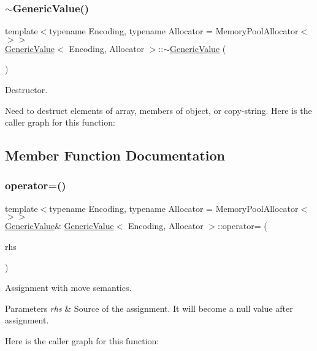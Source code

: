 \subsubsection{\texorpdfstring{$\sim$\+Generic\+Value()}{~GenericValue()}}
{\footnotesize\ttfamily template$<$typename Encoding, typename Allocator = Memory\+Pool\+Allocator$<$$>$$>$ \\
\hyperlink{class_generic_value}{Generic\+Value}$<$ Encoding, Allocator $>$\+::$\sim$\hyperlink{class_generic_value}{Generic\+Value} (\begin{DoxyParamCaption}{ }\end{DoxyParamCaption})\hspace{0.3cm}{\ttfamily [inline]}}



Destructor. 

Need to destruct elements of array, members of object, or copy-\/string. Here is the caller graph for this function\+:


\subsection{Member Function Documentation}
\mbox{\label{class_generic_value_a9018a40d7c52efc00daf803c51d3236c}} 
\subsubsection{\texorpdfstring{operator=()}{operator=()}\hspace{0.1cm}{\footnotesize\ttfamily [1/2]}}
{\footnotesize\ttfamily template$<$typename Encoding, typename Allocator = Memory\+Pool\+Allocator$<$$>$$>$ \\
\hyperlink{class_generic_value}{Generic\+Value}\& \hyperlink{class_generic_value}{Generic\+Value}$<$ Encoding, Allocator $>$\+::operator= (\begin{DoxyParamCaption}\item[{\hyperlink{class_generic_value}{Generic\+Value}$<$ Encoding, Allocator $>$ \&}]{rhs }\end{DoxyParamCaption})\hspace{0.3cm}{\ttfamily [inline]}}



Assignment with move semantics. 


\begin{DoxyParams}{Parameters}
{\em rhs} & Source of the assignment. It will become a null value after assignment. \\
\hline
\end{DoxyParams}
Here is the caller graph for this function\+:
\mbox{\label{class_generic_value_a386708557555e6389184de608af5e6a6}} 

